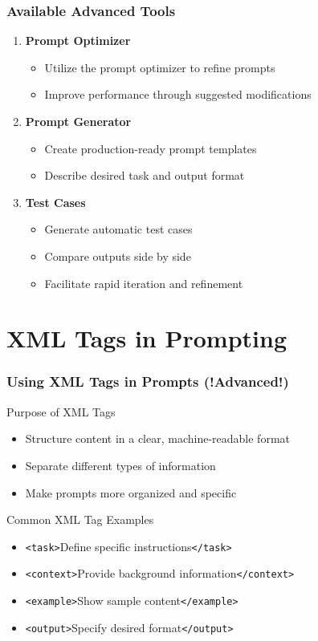\documentclass{beamer}
\begin{document}
\begin{frame}
\frametitle{Available Advanced Tools}
\begin{enumerate}
\item \textbf{Prompt Optimizer}
\begin{itemize}
\item Utilize the prompt optimizer to refine prompts
\item Improve performance through suggested modifications
\end{itemize}

\item \textbf{Prompt Generator}
\begin{itemize}
\item Create production-ready prompt templates
\item Describe desired task and output format
\end{itemize}

\item \textbf{Test Cases}
\begin{itemize}
\item Generate automatic test cases
\item Compare outputs side by side
\item Facilitate rapid iteration and refinement
\end{itemize}
\end{enumerate}
\end{frame}
\section{XML Tags in Prompting}
\frame{\sectionpage}

\begin{frame}
\frametitle{Using XML Tags in Prompts (!Advanced!)}

\begin{block}{Purpose of XML Tags}
\begin{itemize}
\item Structure content in a clear, machine-readable format
\item Separate different types of information
\item Make prompts more organized and specific
\end{itemize}
\end{block}

\begin{exampleblock}{Common XML Tag Examples}
\begin{itemize}
\item \texttt{<task>}Define specific instructions\texttt{</task>}
\item \texttt{<context>}Provide background information\texttt{</context>}
\item \texttt{<example>}Show sample content\texttt{</example>}
\item \texttt{<output>}Specify desired format\texttt{</output>}
\end{itemize}
\end{exampleblock}

\end{frame}
\end{document}
